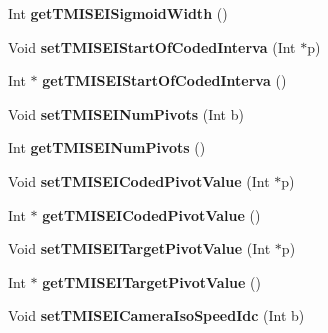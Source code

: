 \begin{DoxyCompactItemize}
\item 
\mbox{\label{class_t_enc_cfg_a103433b1debd32dccc8b613a3ae09863}} 
Int {\bfseries get\+T\+M\+I\+S\+E\+I\+Sigmoid\+Width} ()
\item 
\mbox{\label{class_t_enc_cfg_a2ad1b500046c0daaf7b072557664d816}} 
Void {\bfseries set\+T\+M\+I\+S\+E\+I\+Start\+Of\+Coded\+Interva} (Int $\ast$p)
\item 
\mbox{\label{class_t_enc_cfg_a66a2d36cd753e93d9e917744efbec48f}} 
Int $\ast$ {\bfseries get\+T\+M\+I\+S\+E\+I\+Start\+Of\+Coded\+Interva} ()
\item 
\mbox{\label{class_t_enc_cfg_ad37e23554058f4ba25af6bc2ec6ec706}} 
Void {\bfseries set\+T\+M\+I\+S\+E\+I\+Num\+Pivots} (Int b)
\item 
\mbox{\label{class_t_enc_cfg_ab97fdaea12c6599ae7dd3bceb95b16b8}} 
Int {\bfseries get\+T\+M\+I\+S\+E\+I\+Num\+Pivots} ()
\item 
\mbox{\label{class_t_enc_cfg_a6efcee785d9b84e18e2036048dfdb805}} 
Void {\bfseries set\+T\+M\+I\+S\+E\+I\+Coded\+Pivot\+Value} (Int $\ast$p)
\item 
\mbox{\label{class_t_enc_cfg_a40b944b454539e4d8af47c7c7a3e53b1}} 
Int $\ast$ {\bfseries get\+T\+M\+I\+S\+E\+I\+Coded\+Pivot\+Value} ()
\item 
\mbox{\label{class_t_enc_cfg_a2bf54ab4471f49335341b411d25664ba}} 
Void {\bfseries set\+T\+M\+I\+S\+E\+I\+Target\+Pivot\+Value} (Int $\ast$p)
\item 
\mbox{\label{class_t_enc_cfg_afd5db990b58636744a8ccd5eda1b2d73}} 
Int $\ast$ {\bfseries get\+T\+M\+I\+S\+E\+I\+Target\+Pivot\+Value} ()
\item 
\mbox{\label{class_t_enc_cfg_a99f4f01c86e826235cf3853f6f732982}} 
Void {\bfseries set\+T\+M\+I\+S\+E\+I\+Camera\+Iso\+Speed\+Idc} (Int b)
\item 
\mbox{\label{class_t_enc_cfg_ae8c68164f098e6376d883c0d8f1423c5}} 

\end{DoxyCompactItemize}
